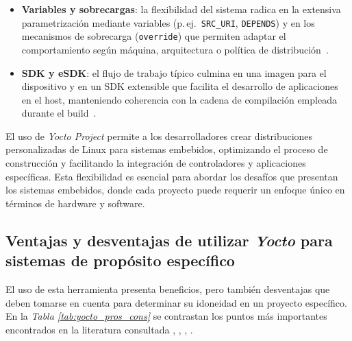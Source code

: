 \begin{itemize}
    \item \textbf{Variables y sobrecargas}: la flexibilidad del sistema radica en la extensiva parametrización mediante variables (p.\,ej.\ \texttt{SRC\_URI}, \texttt{DEPENDS}) y en los mecanismos de sobrecarga (\texttt{override}) que permiten adaptar el comportamiento según máquina, arquitectura o política de distribución \cite{bitbake_manual_2025}.  
    \item \textbf{SDK y eSDK}: el flujo de trabajo típico culmina en una imagen para el dispositivo y en un SDK extensible que facilita el desarrollo de aplicaciones en el host, manteniendo coherencia con la cadena de compilación empleada durante el build \cite{yocto_overview_2025}.  
  \end{itemize}

El uso de \textit{Yocto Project} permite a los desarrolladores crear distribuciones personalizadas de Linux para sistemas embebidos, optimizando el proceso de construcción y facilitando la integración de controladores y aplicaciones específicas. Esta flexibilidad es esencial para abordar los desafíos que presentan los sistemas embebidos, donde cada proyecto puede requerir un enfoque único en términos de hardware y software.

\subsection{Ventajas y desventajas de utilizar \textit{Yocto} para sistemas de propósito específico}
El uso de esta herramienta presenta beneficios, pero también desventajas que deben tomarse en cuenta para determinar su idoneidad en un proyecto específico. En la \textit{Tabla \ref{tab:yocto_pros_cons}} se contrastan los puntos más importantes encontrados en la literatura consultada \cite{streif_2016}, \cite{abbott_2018}, \cite{pera_2022}, \cite{karacali_2024}.


